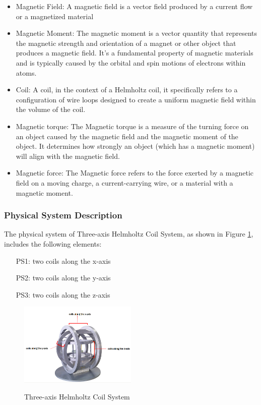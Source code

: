 \documentclass[12pt]{article}
\begin{document}
\begin{itemize}

\item Magnetic Field: A magnetic field is a vector field produced by a current flow or a magnetized material

\item Magnetic Moment: The magnetic moment is a vector quantity that represents the magnetic strength and orientation of a magnet or other object that produces a magnetic field. It's a fundamental property of magnetic materials and is typically caused by the orbital and spin motions of electrons within atoms.

\item Coil: A coil, in the context of a Helmholtz coil, it specifically refers to a configuration of wire loops designed to create a uniform magnetic field within the volume of the coil.
\item Magnetic torque: The Magnetic torque is a measure of the turning force on an object caused by the magnetic field and the magnetic moment of the object. It determines how strongly an object (which has a magnetic moment) will align with the magnetic field.
\item Magnetic force: The Magnetic force refers to the force exerted by a magnetic field on a moving charge, a current-carrying wire, or a material with a magnetic moment.
\end{itemize}

\subsubsection{Physical System Description} \label{sec_phySystDescrip}

The physical system of Three-axis Helmholtz Coil System, as shown in Figure \ref{helmholtz},
includes the following elements:

\begin{itemize}

\item[PS1:]  two coils along the x-axis

\item[PS2:]  two coils along the y-axis

\item[PS3:]  two coils along the z-axis


\end{itemize}

 \begin{figure}[h!]
 \begin{center}
 {
  \includegraphics[width=0.5\textwidth]{hcs.png}
 }
 \caption{\label{helmholtz} Three-axis Helmholtz Coil System}
 \end{center}
 \end{figure}
\end{document}
